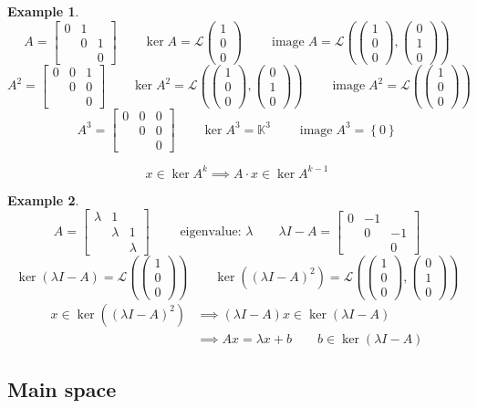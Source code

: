 \documentclass{article}
\newtheorem{example}{Example}  \numberwithin{example}{section}
\newcommand{\set}[1]{\left\{#1\right\}}
\newcommand{\vecthree}[3]{\begin{pmatrix} #1 \\ #2 \\ #3 \end{pmatrix}}
\DeclareMathOperator{\im}{image}
\begin{document}
\begin{example} %
  \[ A = \begin{bmatrix} 0 & 1 & \\ & 0 & 1 \\ & &  0 \end{bmatrix}
     \qquad \ker{A} = \mathcal L\vecthree 100
     \qquad \im{A} = \mathcal L\left(\vecthree 100, \vecthree 010\right) \]
  \[ A^2 = \begin{bmatrix} 0 & 0 & 1 \\ & 0 & 0 \\ & &  0 \end{bmatrix}
     \qquad \ker{A^2} = \mathcal L\left(\vecthree 100, \vecthree 010\right)
     \qquad \im{A^2} = \mathcal L\left(\vecthree 100\right) \]
  \[ A^3 = \begin{bmatrix} 0 & 0 & 0 \\ & 0 & 0 \\ & &  0 \end{bmatrix}
     \qquad \ker{A^3} = \mathbb K^3
     \qquad \im{A^3} = \set{0} \]

  \begin{mdframed}
    \[ x \in \ker{A^k} \implies A \cdot x \in \ker{A^{k-1}} \]
  \end{mdframed}
\end{example}

\begin{example}
  \[
    A = \begin{bmatrix} \lambda & 1 &  \\ & \lambda & 1 \\ & & \lambda \end{bmatrix}
    \qquad \text{ eigenvalue: } \lambda
    \qquad \lambda I - A = \begin{bmatrix} 0 & -1 & \\ & 0 & -1 \\ & & 0 \end{bmatrix}
  \]
  \[
    \ker(\lambda I - A) = \mathcal L\left(\vecthree 100\right)
    \qquad \ker((\lambda I - A)^2) = \mathcal L\left(\vecthree 100, \vecthree 010\right)
  \]
  \begin{align*}
    x \in \ker((\lambda I - A)^2)
      &\implies (\lambda I - A) x \in \ker(\lambda I - A) \\
      &\implies Ax = \lambda x + b \qquad b \in \ker(\lambda I - A)
  \end{align*}
\end{example}

\subsection{Main space}
\end{document}
